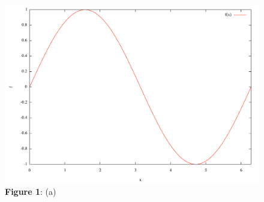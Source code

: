 \documentclass[12pt]{article}
\begin{document}



\begin{figure}[!ht]%
\includegraphics[width=0.99\linewidth]{figure1.pdf}
\caption
{
\textbf{Figure 1}: (a)
}
\end{figure}



\vfil


\printbibliography
\end{document}
